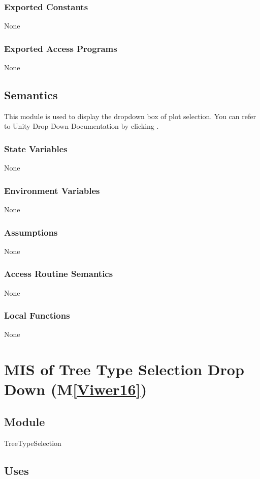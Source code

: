 \documentclass[12pt, titlepage]{article}
\newcommand{\mref}[1]{M\ref{#1}}
\begin{document}
\subsubsection{Exported Constants}
None
\subsubsection{Exported Access Programs}
None

\subsection{Semantics}
This module is used to display the dropdown box of plot 
selection. You can refer to Unity Drop Down Documentation 
by clicking \dref.
\subsubsection{State Variables}
None
\subsubsection{Environment Variables}
None
\subsubsection{Assumptions}
None
\subsubsection{Access Routine Semantics}
None
\subsubsection{Local Functions}
None

\newpage

\section{MIS of Tree Type Selection Drop Down (\mref{Viwer16})} 

\subsection{Module}

TreeTypeSelection

\subsection{Uses}
\end{document}
